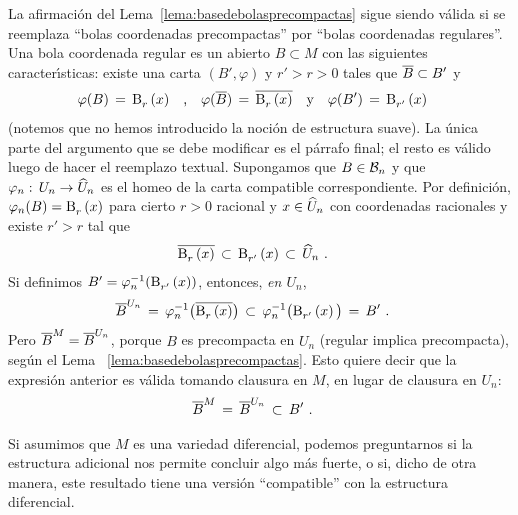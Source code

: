 \begin{obsBaseDeBolasRegulares}\label{obs:basedebolasregulares}
	La afirmaci\'{o}n del Lema~\ref{lema:basedebolasprecompactas} sigue
	siendo v\'{a}lida si se reemplaza ``bolas coordenadas precompactas''
	por ``bolas coordenadas regulares''. Una bola coordenada regular es un
	abierto $B\subset M$ con las siguientes caracter\'{\i}sticas:
	existe una carta $(B',\varphi)$ y $r'>r>0$ tales que
	$\clos B\subset B'$ y
	\begin{align*}
		\varphi(B) \,=\,\bola{r}{x} & \quad\text{,}\quad
			\varphi(\clos B) \,=\,\clos{\bola{r}{x}}
			\quad\text{y}\quad
			\varphi(B') \,=\,\bola{r'}{x}
	\end{align*}
	(notemos que no hemos introducido la noci\'{o}n de estructura suave).
	La \'{u}nica parte del argumento que se debe modificar es
	el p\'{a}rrafo final; el resto es v\'{a}lido luego de hacer el
	reemplazo textual. Supongamos que $B\in\cal B_n$ y que
	$\varphi_n:\,U_n\rightarrow\encoordenadas U_n$ es el homeo de la carta
	compatible correspondiente. Por definici\'{o}n,
	\begin{math}
		\varphi_n(B)=\bola{r}{x}
	\end{math} para cierto $r>0$ racional y $x\in\encoordenadas U_n$ con
	coordenadas racionales y existe $r'>r$ tal que
	\begin{align*}
		\clos{\bola{r}{x}} & \,\subset\,\bola{r'}{x}\,\subset\,
			\encoordenadas U_n
		\text{ .}
	\end{align*}
	Si definimos $B'=\varphi_n^{-1}(\bola{r'}{x})$, entonces,
	\emph{en $U_n$},
	\begin{align*}
		\clos B^{U_n} & \,=\,\varphi_n^{-1}\big(\clos{\bola{r}{x}}\big)
			\,\subset\,\varphi_n^{-1}\big(\bola{r'}{x}\big)
			\,=\,B'
		\text{ .}
	\end{align*}
	Pero $\clos B^M=\clos B^{U_n}$, porque $B$ es precompacta en $U_n$
	(regular implica precompacta), seg\'{u}n el Lema~%
	\ref{lema:basedebolasprecompactas}. Esto quiere decir que la
	expresi\'{o}n anterior es v\'{a}lida tomando clausura en $M$, en lugar
	de clausura en $U_n$:
	\begin{align*}
		\clos B^M & \,=\,\clos B^{U_n}\,\subset\,B'
		\text{ .}
	\end{align*}
\end{obsBaseDeBolasRegulares}

Si asumimos que $M$ es una variedad diferencial, podemos preguntarnos si la
estructura adicional nos permite concluir algo m\'{a}s fuerte, o si, dicho de
otra manera, este resultado tiene una versi\'{o}n ``compatible'' con la
estructura diferencial.

